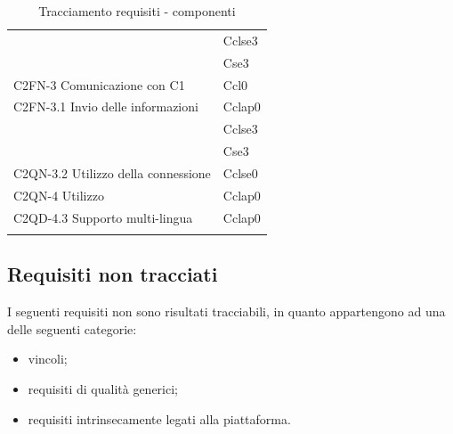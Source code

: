 \begin{footnotesize}
\begin{longtable}[!h]{|l|l|}
 & Cclse3\\
 & Cse3\\\hline 
C2FN-3 Comunicazione con C1 & Ccl0\\ \hline 
C2FN-3.1 Invio delle informazioni & Cclap0\\
 & Cclse3\\
 & Cse3\\\hline 
C2QN-3.2 Utilizzo della connessione & Cclse0\\ \hline 
C2QN-4 Utilizzo & Cclap0\\\hline
C2QD-4.3 Supporto multi-lingua & Cclap0\\ \hline
\caption{Tracciamento requisiti - componenti}
\end{longtable}
\end{footnotesize}

\subsection{Requisiti non tracciati}
I seguenti requisiti non sono risultati tracciabili, in quanto appartengono ad
una delle seguenti categorie:
\begin{itemize}
  \item vincoli;
  \item requisiti di qualit\`a generici;
  \item requisiti intrinsecamente legati alla piattaforma.
\end{itemize}
